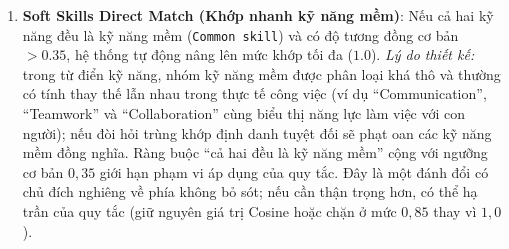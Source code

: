 \begin{itemize}
\begin{enumerate}
\begin{itemize}
            \item Nếu hai kỹ năng có phân nhóm (\texttt{category}) khác nhau (ví dụ: phát triển phần mềm vs kiểm thử), ép độ tương đồng về $0.0$.
            \item Nếu trùng khớp tuyệt đối phân nhóm, nhân thêm hệ số tăng cường $1.2$: $\text{Sim}_{\text{boosted}} = \min(1.0, \text{Sim} \times 1.2)$.
        \end{itemize}
        \item \textbf{Soft Skills Direct Match (Khớp nhanh kỹ năng mềm)}: Nếu cả hai kỹ năng đều là kỹ năng mềm (\texttt{Common skill}) và có độ tương đồng cơ bản $> 0.35$, hệ thống tự động nâng lên mức khớp tối đa ($1.0$). \textit{Lý do thiết kế:} trong từ điển kỹ năng, nhóm kỹ năng mềm được phân loại khá thô và thường có tính thay thế lẫn nhau trong thực tế công việc (ví dụ ``Communication'', ``Teamwork'' và ``Collaboration'' cùng biểu thị năng lực làm việc với con người); nếu đòi hỏi trùng khớp định danh tuyệt đối sẽ phạt oan các kỹ năng mềm đồng nghĩa. Ràng buộc ``cả hai đều là kỹ năng mềm'' cộng với ngưỡng cơ bản $0{,}35$ giới hạn phạm vi áp dụng của quy tắc. Đây là một đánh đổi có chủ đích nghiêng về phía không bỏ sót; nếu cần thận trọng hơn, có thể hạ trần của quy tắc (giữ nguyên giá trị Cosine hoặc chặn ở mức $0{,}85$ thay vì $1{,}0$).
    \end{enumerate}


\end{itemize}
